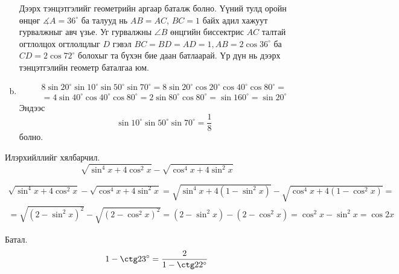\documentclass[10pt,a4paper,oneside]{book}
\begin{document}
\begin{enumerate}[(a)]
\begin{equation*}
\end{equation*}
Дээрх тэнцэтгэлийг геометрийн аргаар баталж болно. Үүний тулд оройн өнцөг $\measuredangle A = 36^\circ$ ба талууд нь $AB=AC$, $BC=1$ байх адил хажуут гурвалжныг авч үзье. Уг гурвалжны $\angle B$ өнцгийн биссектрис $AC$ талтай огтлолцох огтлолцлыг $D$ гэвэл $BC=BD=AD=1, AB=2\cos 36^\circ$ ба $CD=2\cos 72^\circ$ болохыг та бүхэн бие даан батлаарай. Үр дүн нь дээрх тэнцэтгэлийн геометр баталгаа юм.
\item
\begin{equation*}
\begin{split}
8\sin 20^\circ\sin 10^\circ\sin50^\circ\sin70^\circ = 8\sin 20^\circ\cos 20^\circ\cos40^\circ\cos80^\circ =\\
= 4\sin 40^\circ\cos 40^\circ\cos 80^\circ=2\sin 80^\circ\cos 80^\circ = \sin 160^\circ = \sin 20^\circ
\end{split}
\end{equation*}
Эндээс
\begin{equation*}
\sin 10^\circ\sin 50^\circ\sin 70^\circ = \frac{1}{8}
\end{equation*}
болно.
\end{enumerate}

\Problem Илэрхийллийг хялбарчил.
\begin{equation*}
\sqrt{\sin^4 x + 4\cos^2 x}-\sqrt{\cos^4 x + 4\sin^2 x}
\end{equation*}

\TheSolution
\begin{equation*}
\begin{split}
\sqrt{\sin^4 x + 4\cos^2 x}-\sqrt{\cos^4 x + 4\sin^2 x} = \sqrt{\sin^4 x + 4\left(1-\sin^2 x\right)}-\sqrt{\cos^4 x + 4\left(1-\cos^2 x\right)}=\\
 =\sqrt{\left(2-\sin^2 x\right)^2}-\sqrt{\left(2-\cos^2 x\right)^2} = \left(2-\sin^2 x\right) - \left(2-\cos^2 x\right) = \cos^2 x - \sin^2 x = \cos 2x
\end{split}
\end{equation*}

\Problem Батал.
\begin{equation*}
1-\ctg 23^\circ = \frac{2}{1-\ctg 22^\circ}
\end{equation*}
\end{document}
